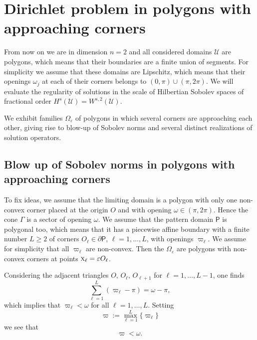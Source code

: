 \documentclass[titlepage,12pt]{amsart}
\theoremstyle{definition}
\theoremstyle{remark}
\numberwithin{equation}{section}
\newcommand{\sU}{{\mathscr U}}
\newcommand{\rP}{{\mathsf{P}}}
\begin{document}
\section{Dirichlet problem in polygons with approaching corners}
\label{S:polygon}
{From now on we are in dimension $n=2$ and all considered domains $\sU$ are polygons, which means that their boundaries are a finite union of segments. For simplicity we assume that these domains are Lipschitz, which means that their openings $\omega_j$ at each of their corners belongs to $(0,\pi)\cup(\pi,2\pi)$.  We will evaluate the regularity of solutions in the scale of Hilbertian Sobolev spaces of fractional order $H^s(\sU)=W^{s,2}(\sU)$.

We exhibit families $\Omega_\varepsilon$ of polygons in which several corners are approaching each other, giving rise to blow-up of Sobolev norms and several distinct realizations of solution operators.


\subsection{Blow up of Sobolev norms in polygons with approaching corners}
\label{ss:AppCor}
To fix ideas, we assume that the limiting domain is a polygon with only one non-convex corner placed at the origin $O$ and with opening $\omega\in(\pi,2\pi)$. Hence the cone $\Gamma$ is a sector of opening $\omega$. We assume that the pattern domain $\rP$ is polygonal too, which means that it has a piecewise affine boundary with a finite number $L\ge2$ of corners $O_\ell\in\partial\rP$, $\ell=1,\ldots,L$, with openings $\varpi_\ell$. We assume for simplicity that all $\varpi_\ell$ are non-convex. 
Then the $\Omega_\varepsilon$ are polygons with non-convex corners at points ${\textsc x}_\ell=\varepsilon O_\ell$. 

Considering the adjacent triangles $O,\,O_\ell,\,O_{\ell+1}$ for $\ell=1,\ldots,L-1$, one finds
\begin{equation}
\label{eq:varpi}
   \sum_{\ell=1}^L  (\varpi_\ell - \pi) = \omega -\pi,
\end{equation}
which implies that $\varpi_\ell<\omega$ for all $\ell=1,\ldots,L$. Setting
\begin{equation}
\label{eq:varpimax}
   \varpi := \max_{\ell=1}^L\{\varpi_\ell\}
\end{equation}
we see that
\begin{equation}
\label{eq:varpipi}
   \varpi < \omega.
\end{equation}

}
\end{document}

